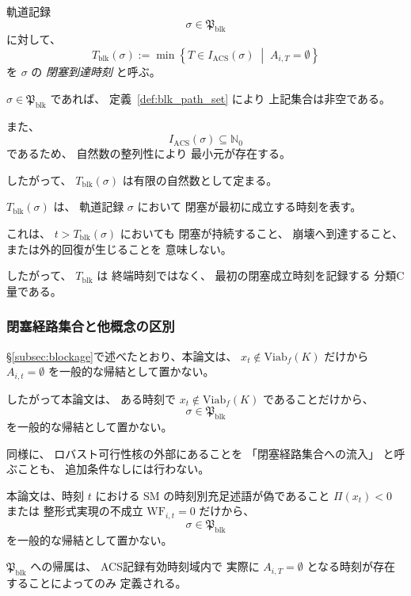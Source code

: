 \begin{definition}
\label{def:blk_reaching_time}
軌道記録
\[
  \sigma\in\mathfrak{P}_{\mathrm{blk}}
\]
に対して、
\[
  T_{\mathrm{blk}}(\sigma)
  :=
  \min
  \left\{
    T\in I_{\mathrm{ACS}}(\sigma)
    \;\middle|\;
    A_{i,T}=\emptyset
  \right\}
\]
を
$\sigma$ の
\emph{閉塞到達時刻}
と呼ぶ。

$\sigma\in\mathfrak{P}_{\mathrm{blk}}$
であれば、
定義~\ref{def:blk_path_set} により
上記集合は非空である。

また、
\[
  I_{\mathrm{ACS}}(\sigma)
  \subseteq
  \mathbb{N}_0
\]
であるため、
自然数の整列性により
最小元が存在する。

したがって、
$T_{\mathrm{blk}}(\sigma)$
は有限の自然数として定まる。
\end{definition}

\begin{remark}[閉塞到達時刻は最初の閉塞時刻にすぎない]
\label{rem:blk_reaching_time}
$T_{\mathrm{blk}}(\sigma)$ は、
軌道記録 $\sigma$ において
閉塞が最初に成立する時刻を表す。

これは、
$t>T_{\mathrm{blk}}(\sigma)$
においても
閉塞が持続すること、
崩壊へ到達すること、
または外的回復が生じることを
意味しない。

したがって、
$T_{\mathrm{blk}}$
は
終端時刻ではなく、
最初の閉塞成立時刻を記録する
分類C量である。
\end{remark}

\subsubsection{閉塞経路集合と他概念の区別}

\begin{remark}[核外性と閉塞経路集合への帰属の関係]
\label{rem:viab_outside_not_blk_path}
\S\ref{subsec:blockage}で述べたとおり、本論文は、
$x_t\notin\mathrm{Viab}_f(K)$
だけから
$A_{i,t}=\emptyset$
を一般的な帰結として置かない。

したがって本論文は、
ある時刻で
$x_t\notin\mathrm{Viab}_f(K)$
であることだけから、
\[
  \sigma\in\mathfrak{P}_{\mathrm{blk}}
\]
を一般的な帰結として置かない。

同様に、
ロバスト可行性核の外部にあることを
「閉塞経路集合への流入」
と呼ぶことも、
追加条件なしには行わない。
\end{remark}

\begin{remark}
\label{rem:sm_wf_not_blk_path}
本論文は、時刻 $t$ における
SM の時刻別充足述語が偽であること
$\Pi(x_t)<0$
または
整形式実現の不成立
$\mathrm{WF}_{i,t}=0$
だけから、
\[
  \sigma\in\mathfrak{P}_{\mathrm{blk}}
\]
を一般的な帰結として置かない。

$\mathfrak{P}_{\mathrm{blk}}$
への帰属は、
ACS記録有効時刻域内で
実際に
$A_{i,T}=\emptyset$
となる時刻が存在することによってのみ
定義される。
\end{remark}

